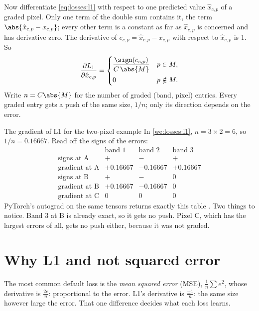Now differentiate \cref{eq:losses:l1} with respect to one predicted value $\hat{x}_{c,p}$ of a
graded pixel. Only one term of the double sum contains it, the term $\abs{\hat{x}_{c,p} -
x_{c,p}}$; every other term is a constant as far as $\hat{x}_{c,p}$ is concerned and has
derivative zero. The derivative of $e_{c,p} = \hat{x}_{c,p} - x_{c,p}$ with respect to
$\hat{x}_{c,p}$ is 1. So
\begin{equation}\label{eq:losses:l1grad}
\frac{\partial L_1}{\partial \hat{x}_{c,p}} =
\begin{cases}
\dfrac{\sign(e_{c,p})}{C\,\abs{M}} & p \in M,\\[8pt]
0 & p \notin M.
\end{cases}
\end{equation}
Write $n = C\abs{M}$ for the number of graded (band, pixel) entries. Every graded entry gets a
push of the same size, $1/n$; only its direction depends on the error.

\begin{worked}[label={we:losses:l1grad}]{The gradient of L1 for the two-pixel example}
In \cref{we:losses:l1}, $n = 3 \times 2 = 6$, so $1/n = 0.16667$. Read off the signs of the
errors:
\[
\begin{array}{lccc}
 & \text{band 1} & \text{band 2} & \text{band 3}\\
\text{signs at A} & + & - & + \\
\text{gradient at A} & +0.16667 & -0.16667 & +0.16667\\
\text{signs at B} & + & - & 0\\
\text{gradient at B} & +0.16667 & -0.16667 & 0\\
\text{gradient at C} & 0 & 0 & 0
\end{array}
\]
PyTorch's autograd on the same tensors returns exactly this table \tagC. Two things to notice.
Band 3 at B is already exact, so it gets no push. Pixel C, which has the largest errors of
all, gets no push either, because it was not graded.
\end{worked}

\section{Why L1 and not squared error}\label{sec:losses:l1l2}

The most common default loss is the \emph{mean squared error} (MSE),
$\frac{1}{n}\sum e^2$, whose derivative is $\frac{2e}{n}$: proportional to the error. L1's
derivative is $\frac{\pm 1}{n}$: the same size however large the error. That one difference
decides what each loss learns.

